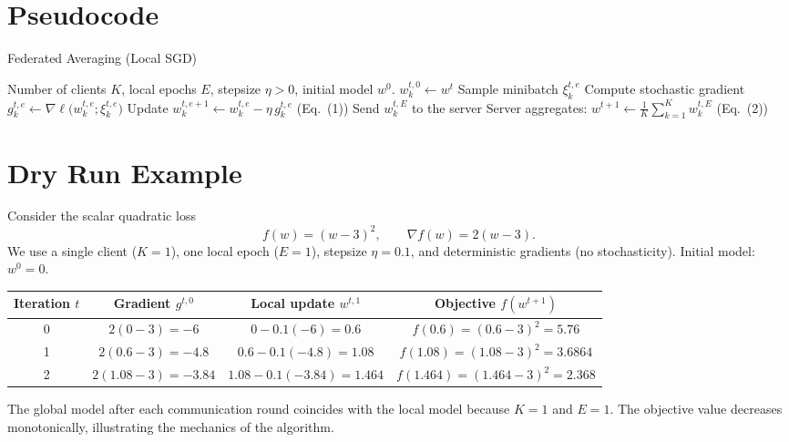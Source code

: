 \documentclass{article}
\begin{document}
\section*{Pseudocode}
\begin{algorithm}[H]
\caption{Federated Averaging (Local SGD)}\label{alg:fedavg}
\begin{algorithmic}[1]
\Require Number of clients \(K\), local epochs \(E\), stepsize \(\eta>0\), initial model \(w^{0}\).
        \State \(w_{k}^{t,0}\gets w^{t}\)
            \State Sample minibatch \(\xi_{k}^{t,e}\)
            \State Compute stochastic gradient \(g_{k}^{t,e}\gets\nabla\ell\!\big(w_{k}^{t,e};\xi_{k}^{t,e}\big)\)
            \State Update \(w_{k}^{t,e+1}\gets w_{k}^{t,e}-\eta\, g_{k}^{t,e}\) \hfill (Eq.~(1))
        \EndFor
        \State Send \(w_{k}^{t,E}\) to the server
    \EndFor
    \State Server aggregates: \(w^{t+1}\gets \frac1K\sum_{k=1}^{K} w_{k}^{t,E}\) \hfill (Eq.~(2))
\EndFor
\end{algorithmic}
\end{algorithm}

\section*{Dry Run Example}
Consider the scalar quadratic loss  
\[
f(w)= (w-3)^{2},\qquad \nabla f(w)=2(w-3).
\]
We use a single client (\(K=1\)), one local epoch (\(E=1\)), stepsize \(\eta=0.1\), and deterministic gradients (no stochasticity).  
Initial model: \(w^{0}=0\).

\begin{center}
\begin{tabular}{c|c|c|c}
Iteration \(t\) & Gradient \(g^{t,0}\) & Local update \(w^{t,1}\) & Objective \(f(w^{t+1})\)\\\hline
0 & \(2(0-3)=-6\) & \(0-0.1(-6)=0.6\) & \(f(0.6)=(0.6-3)^{2}=5.76\)\\
1 & \(2(0.6-3)=-4.8\) & \(0.6-0.1(-4.8)=1.08\) & \(f(1.08)=(1.08-3)^{2}=3.6864\)\\
2 & \(2(1.08-3)=-3.84\) & \(1.08-0.1(-3.84)=1.464\) & \(f(1.464)=(1.464-3)^{2}=2.368\)\\
\end{tabular}
\end{center}
The global model after each communication round coincides with the local model because \(K=1\) and \(E=1\). The objective value decreases monotonically, illustrating the mechanics of the algorithm.
\end{document}
